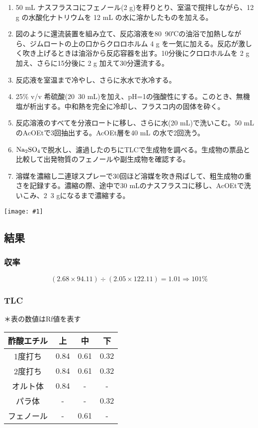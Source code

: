 \documentclass[a4paper,papersize,dvipdfmx]{jsarticle}
\newcommand{\pict}[2]{\begin{center} \texttt{[image: \#1]} \end{center}}   %
\begin{document}
\begin{enumerate}
\item 50 mL ナスフラスコにフェノール(2 g)を秤りとり、室温で撹拌しながら、12 g の水酸化ナトリウムを 12 mL の水に溶かしたものを加える。

\item 図のように還流装置を組み立て、反応溶液を80~90℃の油浴で加熱しながら、ジムロートの上の口からクロロホルム 4 g を一気に加える。反応が激しく吹き上げるときは油浴から反応容器を出す。10分後にクロロホルムを 2 g 加え、さらに15分後に 2 g 加えて30分還流する。

\item 反応液を室温まで冷やし、さらに氷水で氷冷する。

\item 25\% v/v 希硫酸(20~30 mL)を加え、pH=1の強酸性にする。このとき、無機塩が析出する。中和熱を完全に冷却し、フラスコ内の固体を砕く。

\item 反応溶液のすべてを分液ロートに移し、さらに水(20 mL)で洗いこむ。50 mL のAcOEtで3回抽出する。AcOEt層を40 mL の水で2回洗う。
\item $\rm Na_2SO_4$で脱水し、濾過したのちにTLCで生成物を調べる。生成物の票品と比較して出発物質のフェノールや副生成物を確認する。
\item 溶媒を濃縮し二連球スプレーで30回ほど溶媒を吹き飛ばして、粗生成物の重さを記録する。濃縮の際、途中で30 mLのナスフラスコに移し、AcOEtで洗いこみ、2~3 gになるまで濃縮する。

\end{enumerate}
\pict{imgs/2-zu.jpeg}{4}
\subsection*{結果}

\subsubsection*{収率}
\[(2.68 \times 94.11) \div (2.05 \times 122.11) = 1.01 \Longrightarrow 101 \%\]

\subsubsection*{TLC}
＊表の数値はRf値を表す

\begin{table}[h]
\begin{tabular}{|c|c|c|c|}
\hline
酢酸エチル & 上    & 中    & 下    \\ \hline
1度打ち  & 0.84 & 0.61 & 0.32 \\ \hline
2度打ち  & 0.84 & 0.61 & 0.32 \\ \hline
オルト体  & 0.84 & -    & -    \\ \hline
パラ体   & -    & -    & 0.32 \\ \hline
フェノール & -    & 0.61 & -    \\ \hline
\end{tabular}
\end{table}
\end{document}
